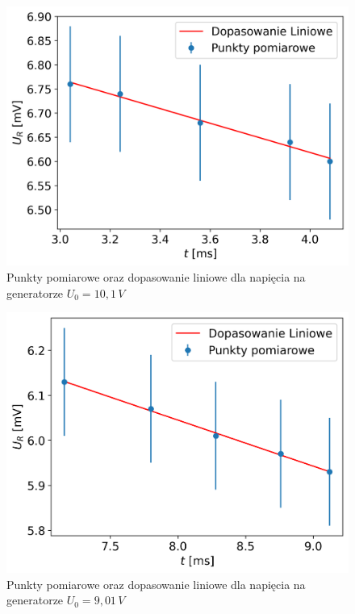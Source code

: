 \documentclass[12pt]{article}
\begin{document}
\begin{figure}[H]
    \centering
    \includegraphics[scale=0.58]{nachylenie_1}
    \caption{Punkty pomiarowe oraz dopasowanie liniowe dla napięcia na generatorze $U_0 = 10{,}1 \, V$}
    \label{fig:line_fit_graph}
\end{figure}
\begin{figure}[H]
    \centering
    \includegraphics[scale=0.58]{nachylenie_2}
    \caption{Punkty pomiarowe oraz dopasowanie liniowe dla napięcia na generatorze $U_0 = 9{,}01 \, V$}
\end{figure}
\end{document}
